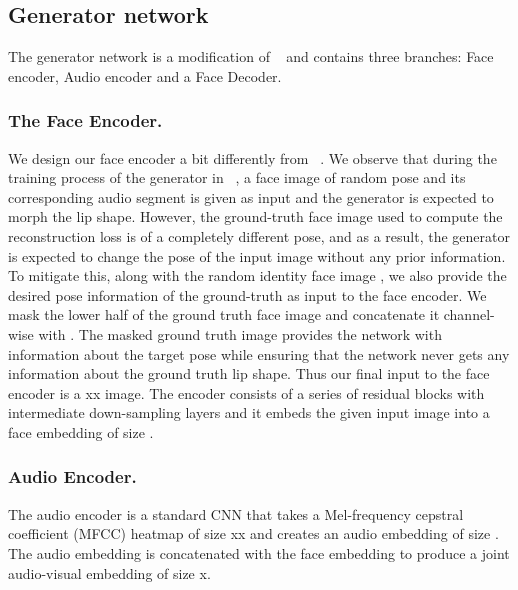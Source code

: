 \documentclass[sigconf]{acmart}
\begin{document}
\subsection{Generator network} The generator network is a modification of ~\citet{chung2017you} and contains three branches:  Face encoder,  Audio encoder and a  Face Decoder.

\subsubsection{The Face Encoder.} We design our face encoder a bit differently from ~\citet{chung2017you}. We observe that during the training process of the generator in ~\cite{chung2017you}, a face image of random pose and its corresponding audio segment is given as input and the generator is expected to morph the lip shape. However, the ground-truth face image used to compute the reconstruction loss is of a completely different pose, and as a result, the generator is expected to change the pose of the input image without any prior information. To mitigate this, along with the random identity face image , we also provide the desired pose information of the ground-truth as input to the face encoder. We mask the lower half of the ground truth face image and concatenate it channel-wise with . The masked ground truth image provides the network with information about the target pose while ensuring that the network never gets any information about the ground truth lip shape. Thus our final input to the face encoder is a xx image. The encoder consists of a series of residual blocks with intermediate down-sampling layers and it embeds the given input image into a face embedding of size .

\subsubsection{Audio Encoder.} The audio encoder is a standard CNN that takes a Mel-frequency cepstral coefficient (MFCC) heatmap of size xx and creates an audio embedding of size . The audio embedding is concatenated with the face embedding to produce a joint audio-visual embedding of size x.
\end{document}
